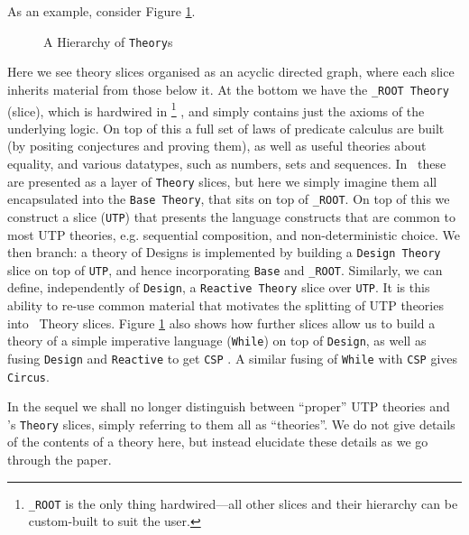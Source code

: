 As an example, consider Figure \ref{fig:hier-of-theory}.
\begin{figure}[tb]
  \centering
  \caption{A Hierarchy of \texttt{Theory}s}
  \label{fig:hier-of-theory}
\end{figure}
Here we see theory slices organised as an acyclic directed graph,
where each slice inherits material from those below it.
At the bottom we have the \texttt{\_ROOT Theory} (slice),
which is hardwired in%
\footnote{
\texttt{\_ROOT} is the only thing hardwired---all other slices and their hierarchy
can be custom-built to suit the user.
}%
, and simply contains just the axioms of the underlying logic.
On top of this a full set of laws of predicate calculus are built
(by positing conjectures and proving them), as well as useful theories about equality,
and various datatypes, such as numbers, sets and sequences.
In \ these are presented as a layer of \texttt{Theory} slices,
but here we simply imagine them all encapsulated into the \texttt{Base Theory},
that sits on top of \texttt{\_ROOT}.
On top of this we construct a slice (\texttt{UTP}) that presents the language constructs
that are common to most UTP theories,
e.g. sequential composition, and non-deterministic choice.
We then branch: a theory of Designs is implemented
by building a \texttt{Design Theory} slice on top of \texttt{UTP},
and hence incorporating \texttt{Base} and \texttt{\_ROOT}.
Similarly, we can define, independently of \texttt{Design},
a \texttt{Reactive Theory} slice over \texttt{UTP}.
It is this ability to re-use common material that motivates
the splitting of UTP theories into \ Theory slices.
Figure \ref{fig:hier-of-theory} also shows how further slices
allow us to build a theory of a simple imperative language (\texttt{While}) on top of \texttt{Design},
as well as fusing \texttt{Design} and \texttt{Reactive} to get \texttt{CSP} \cite{Roscoe1997}.
A similar fusing of \texttt{While} with \texttt{CSP} gives \texttt{Circus}\cite{journals/fac/OliveiraCW09}.

In the sequel we shall no longer distinguish between ``proper'' UTP theories
and 's \texttt{Theory} slices, simply referring to them all as ``theories''.
We do not give details of the contents of a theory here,
but instead elucidate these details as we go through the paper.
